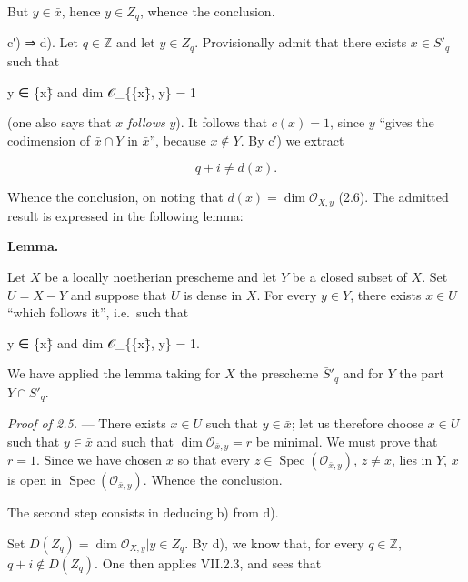 \documentclass[
  11pt,
  a4paper,
]{book}
\newenvironment{Shaded}{}{}
\newcommand{\NormalTok}[1]{#1}
\begin{document}
But \(y \in \bar{x}\), hence \(y \in Z_{q}\), whence the conclusion.

c′) ⇒ d). Let \(q \in \mathbb{Z}\) and let \(y \in Z_{q}\).
Provisionally admit that there exists \(x \in S'_{q}\) such that

\begin{Shaded}
\begin{Highlighting}[]
\NormalTok{y ∈ \{x\}̄    and    dim 𝒪\_\{\{x\}̄, y\} = 1}
\end{Highlighting}
\end{Shaded}

(one also says that \(x\) \emph{follows} \(y\)). It follows that
\(c(x) = 1\), since \(y\) ``gives the codimension of \(\bar{x} \cap Y\)
in \(\bar{x}\)'', because \(x \notin Y\). By c′) we extract

\[ q + i \neq d(x). \]

Whence the conclusion, on noting that \(d(x) = \dim \mathcal{O}_{X, y}\)
(2.6). The admitted result is expressed in the following lemma:

\textbf{Lemma.}

Let \(X\) be a locally noetherian prescheme and let \(Y\) be a closed
subset of \(X\). Set \(U = X - Y\) and suppose that \(U\) is dense in
\(X\). For every \(y \in Y\), there exists \(x \in U\) ``which follows
it'', i.e.~such that

\begin{Shaded}
\begin{Highlighting}[]
\NormalTok{y ∈ \{x\}̄    and    dim 𝒪\_\{\{x\}̄, y\} = 1.}
\end{Highlighting}
\end{Shaded}

We have applied the lemma taking for \(X\) the prescheme
\(\bar{S}'_{q}\) and for \(Y\) the part \(Y \cap \bar{S}'_{q}\).

\emph{Proof of 2.5.} --- There exists \(x \in U\) such that
\(y \in \bar{x}\); let us therefore choose \(x \in U\) such that \(y \in
\bar{x}\) and such that \(\dim \mathcal{O}_{\bar{x}, y} = r\) be
minimal. We must prove that \(r = 1\). Since we have chosen \(x\) so
that every \(z \in \operatorname{Spec}(\mathcal{O}_{\bar{x}, y})\),
\(z \neq x\), lies in \(Y\), \({x}\) is open in
\(\operatorname{Spec}(\mathcal{O}_{\bar{x}, y})\). Whence the
conclusion.

The second step consists in deducing b) from d).

Set \(D(Z_{q}) = {\dim \mathcal{O}_{X,y} | y \in Z_{q}}\). By d), we
know that, for every \(q \in \mathbb{Z}\), \(q + i
\notin D(Z_{q})\). One then applies VII.2.3, and sees that
\end{document}
